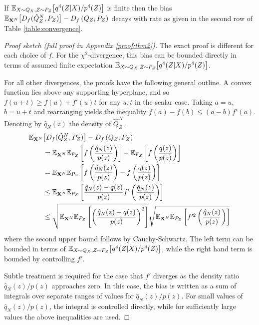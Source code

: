 \begin{theorem}\label{thm:convergence-rate-general}
If $\mathbb{E}_{X\sim Q_X, Z\sim P_Z}\bigl[ q^4(Z|X) / p^4(Z) \bigr]$ is finite then
the bias $\mathbb{E}_{\mathbf{X}^N}\bigl[D_f( \hat{Q}_Z^N , P_Z)\bigr] - D_f\left( Q_{Z} , P_Z\right)$ decays with rate as given in the second row of Table \ref{table:convergence}.
\end{theorem}
\begin{proof}[Proof sketch (full proof in Appendix \ref{proof:thm2})]
The exact proof is different for each choice of $f$.
For the $\chi^2$-divergence, this bias can be bounded directly in terms of assumed finite expectation $\mathbb{E}_{X\sim Q_X, Z\sim P_Z}\bigl[ q^4(Z|X) / p^4(Z) \bigr]$.

For all other divergences, the proofs have the following general outline.
A convex function lies above any supporting hyperplane, and so $f(u + t) \geq f(u) + f'(u)t$ for any $u,t$ in the scalar case.
Taking $a=u$, $b = u+t$ and rearranging yields the inequality $f(a) - f(b) \leq (a-b) f'(a)$.
Denoting by $\hat{q}_N(z)$ the density of $\hat{Q}_Z^N$,
%
\begin{align*}
\mathbb{E}_{\mathbf{X}^N} & \bigl[D_f( \hat{Q}_Z^N , P_Z)\bigr] - D_f\left( Q_{Z} , P_Z\right) \\
&= \mathbb{E}_{\mathbf{X}^N} \mathbb{E}_{P_Z} \left[ f\left( \frac{\hat{q}_N(z)}{p(z)} \right) \right] - \mathbb{E}_{P_Z} \left[ f\left( \frac{q(z)}{p(z)}\right)\right] \\
&= \mathbb{E}_{\mathbf{X}^N} \mathbb{E}_{P_Z} \left[ f\left( \frac{\hat{q}_N(z)}{p(z)} \right) - f\left( \frac{q(z)}{p(z)}\right)\right] \\
&\leq \mathbb{E}_{\mathbf{X}^N} \mathbb{E}_{P_Z} \left[ \frac{\hat{q}_N(z) - q(z)}{p(z)} f'\left(\frac{\hat{q}_N(z)}{p(z)}\right) \right] \\
&\leq \sqrt{\mathbb{E}_{\mathbf{X}^N} \mathbb{E}_{P_Z} \left[ \left( \frac{\hat{q}_N(z) - q(z)}{p(z)} \right)^2 \right]} \sqrt{\mathbb{E}_{\mathbf{X}^N} \mathbb{E}_{P_Z} \left[ f'^2\left(\frac{\hat{q}_N(z)}{p(z)}\right) \right]}
\end{align*}
%
where the second upper bound follows by Cauchy-Schwartz. 
The left term can be bounded in terms of $\mathbb{E}_{X\sim Q_X, Z\sim P_Z}\bigl[ q^4(Z|X) / p^4(Z) \bigr]$, while the right hand term is bounded by controlling $f'$.

Subtle treatment is required for the case that $f'$ diverges as the density ratio $\hat{q}_N(z)/p(z)$ approaches zero.
In this case, the bias is written as a sum of integrals over separate ranges of values for $\hat{q}_N(z)/p(z)$.
For small values of $\hat{q}_N(z)/p(z)$, the integral is controlled directly, while for sufficiently large values the above inequalities are used.

\end{proof}

